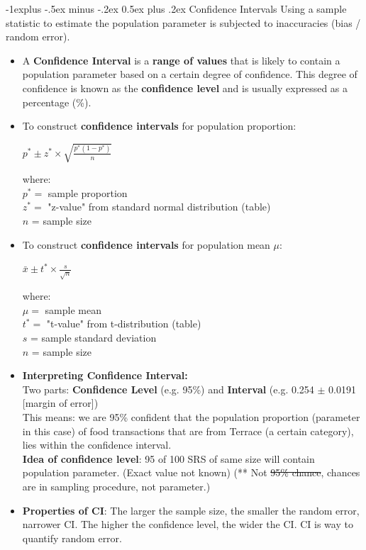 \documentclass[10pt, landscape]{article}
\makeatletter
\renewcommand{\subsection}{\@startsection{subsection}{2}{0mm}%
                                {-1explus -.5ex minus -.2ex}%
                                {0.5ex plus .2ex}%
                                {\normalfont\normalsize\bfseries}}
\makeatother
\begin{document}
\begin{multicols*}{3}
\subsection{Confidence Intervals}
Using a sample statistic to estimate the population parameter is subjected to inaccuracies (bias / random error).
\begin{itemize}
	\item A \textbf{Confidence Interval} is a \textbf{range of values} that is likely to contain a population parameter based on a certain degree of confidence. This degree of confidence is known as the \textbf{confidence level} and is usually expressed as a percentage (\%). \\
	\item To construct \textbf{confidence intervals} for population proportion: \\
	\centerline{$p^* \pm z^* \times \sqrt{\frac{p^* (1-p^*)}{n}} $} 
	where: \\
	$p^* =$ sample proportion  \\
	$z^* =$ "z-value" from standard normal distribution (table)\\
	$n$ = sample size
	\item To construct \textbf{confidence intervals} for population mean $\mu$: \\
	\centerline{$ \bar{x} \pm t^* \times \frac{s}{\sqrt{n}} $} 
	where: \\
	$\mu =$ sample mean\\
	$t^* =$ "t-value" from t-distribution (table)\\
	$s$ = sample standard deviation \\
	$n$ = sample size

	\item \textbf{Interpreting Confidence Interval: } \\ Two parts: \textbf{Confidence Level} (e.g. 95\%) and \textbf{	Interval} (e.g. 0.254 $\pm$ 0.0191 [margin of error]) \\
	This means: we are 95\% confident that the population proportion (parameter in this case) of food transactions that are from Terrace (a certain category), lies within the confidence interval. \\
	\textbf{Idea of confidence level}: 95 of 100 SRS of same size will contain population parameter. (Exact value not known) (** Not \sout{95\% chance}, chances are in sampling procedure, not parameter.)
	\item \textbf{Properties of CI}: The larger the sample size, the smaller the random error, narrower CI. The higher the confidence level, the wider the CI. CI is way to quantify random error.


\end{itemize}
\end{multicols*}
\end{document}
